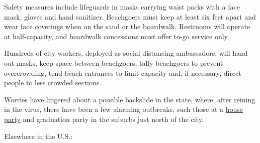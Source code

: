 Safety measures include lifeguards in masks carrying waist packs with a
face mask, gloves and hand sanitizer. Beachgoers must keep at least six
feet apart and wear face coverings when on the sand or the boardwalk.
Restrooms will operate at half-capacity, and boardwalk concessions must
offer to-go service only.

Hundreds of city workers, deployed as social distancing ambassadors,
will hand out masks, keep space between beachgoers, tally beachgoers to
prevent overcrowding, tend beach entrances to limit capacity and, if
necessary, direct people to less crowded sections.

Worries have lingered about a possible backslide in the state, where,
after reining in the virus, there have been a few alarming outbreaks,
such those at a
\href{https://www.nytimes3xbfgragh.onion/2020/07/01/nyregion/rockland-coronavirus-party.html}{house
party} and graduation party in the suburbs just north of the city.

Elsewhere in the U.S.:

